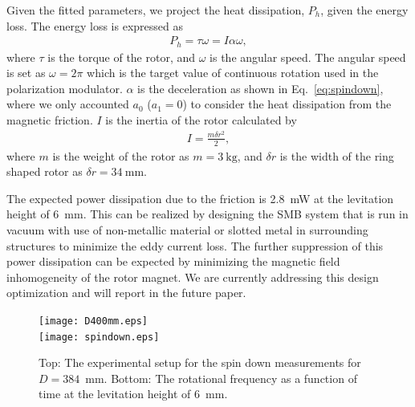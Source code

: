 \documentclass[journal]{IEEEtran}
\begin{document}
Given the fitted parameters, we project the heat dissipation, $P_{h}$, given the energy loss.
The energy loss is expressed as
\begin{eqnarray}
P_{h} = \tau \omega = I \alpha \omega,
\label{eq:energyloss}
\end{eqnarray}
where $\tau$ is the torque of the rotor, and $\omega$ is the angular speed.
The angular speed is set as $\omega = 2 \pi$ which is the target value of continuous rotation used in the polarization modulator.
$\alpha$ is the deceleration as shown in Eq.~\ref{eq:spindown}, where we only accounted $a_0$ ($a_1=0$) to consider the heat dissipation from the magnetic friction.
$I$ is the inertia of the rotor calculated by
\begin{eqnarray}
I = \frac{m \delta r^{2}}{2},
\label{eq:inertia}
\end{eqnarray}
where $m$ is the weight of the rotor as $m=3~\mathrm{kg}$, and $\delta r$ is the width of the ring shaped rotor as $\delta r = 34~\mathrm{mm}$.

The expected power dissipation due to the friction is 2.8~mW at the levitation height of 6~mm.
This can be realized by designing the SMB system that is run in vacuum with use of non-metallic material or slotted metal in surrounding structures to minimize the eddy current loss.
The further suppression of this power dissipation can be expected by minimizing the magnetic field inhomogeneity of the rotor magnet.
We are currently addressing this design optimization and will report in the future paper.


\begin{figure}[htb]
   \centering
   \texttt{[image: D400mm.eps]} \\
   \vspace{3mm}
   \texttt{[image: spindown.eps]}
   \caption{Top: The experimental setup for the spin down measurements for $D=384$~mm. Bottom: The rotational frequency as a function of time at the levitation height of 6~mm.}
   \label{fig:spindown}
\end{figure}
\end{document}

